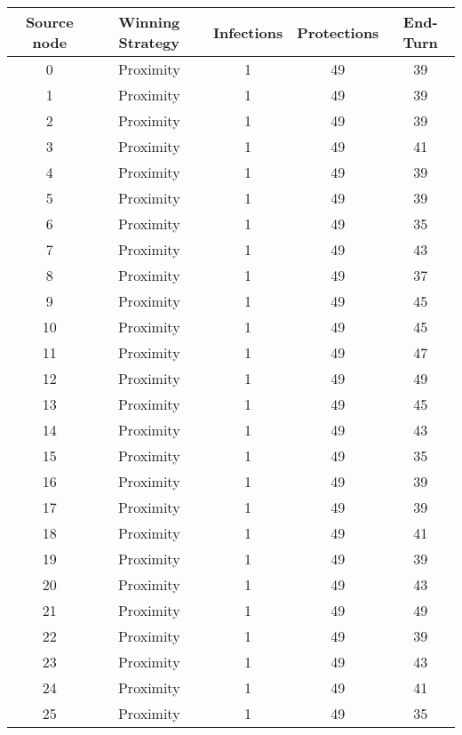 \documentclass[results.tex]{subfiles}
\begin{document}
\begin{center}
  \begin{tabular}{| c || c | c | c | c |}
    \hline
    {\bfseries Source node} & {\bfseries Winning Strategy} & {\bfseries Infections} & {\bfseries Protections} & {\bfseries End-Turn} \\  %
    \hline\hline
    0 & Proximity & 1 & 49 & 39 \\ 
    \hline
    1 & Proximity & 1 & 49 & 39 \\ 
    \hline
    2 & Proximity & 1 & 49 & 39 \\ 
    \hline
    3 & Proximity & 1 & 49 & 41 \\ 
    \hline
    4 & Proximity & 1 & 49 & 39 \\ 
    \hline
    5 & Proximity & 1 & 49 & 39 \\ 
    \hline
    6 & Proximity & 1 & 49 & 35 \\ 
    \hline
    7 & Proximity & 1 & 49 & 43 \\ 
    \hline
    8 & Proximity & 1 & 49 & 37 \\ 
    \hline
    9 & Proximity & 1 & 49 & 45 \\ 
    \hline
    10 & Proximity & 1 & 49 & 45 \\ 
    \hline
    11 & Proximity & 1 & 49 & 47 \\ 
    \hline
    12 & Proximity & 1 & 49 & 49 \\ 
    \hline
    13 & Proximity & 1 & 49 & 45 \\ 
    \hline
    14 & Proximity & 1 & 49 & 43 \\ 
    \hline
    15 & Proximity & 1 & 49 & 35 \\ 
    \hline
    16 & Proximity & 1 & 49 & 39 \\ 
    \hline
    17 & Proximity & 1 & 49 & 39 \\ 
    \hline
    18 & Proximity & 1 & 49 & 41 \\ 
    \hline
    19 & Proximity & 1 & 49 & 39 \\ 
    \hline
    20 & Proximity & 1 & 49 & 43 \\ 
    \hline
    21 & Proximity & 1 & 49 & 49 \\ 
    \hline
    22 & Proximity & 1 & 49 & 39 \\ 
    \hline
    23 & Proximity & 1 & 49 & 43 \\ 
    \hline
    24 & Proximity & 1 & 49 & 41 \\ 
    \hline
    25 & Proximity & 1 & 49 & 35 \\ 

\end{tabular}
\end{center}
\end{document}
